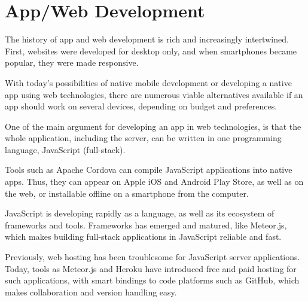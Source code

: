 \section{App/Web Development}

The history of app and web development is rich and increasingly intertwined. First, websites were developed for desktop only, and when smartphones became popular, they were made responsive.

With today's possibilities of native mobile development or developing a native app using web technologies, there are numerous viable alternatives available if an app should work on several devices, depending on budget and preferences.

One of the main argument for developing an app in web technologies, is that the whole application, including the server, can be written in one programming language, JavaScript (full-stack).

Tools such as Apache Cordova can compile JavaScript applications into native apps. Thus, they can appear on Apple iOS and Android Play Store, as well as on the web, or installable offline on a smartphone from the computer.

JavaScript is developing rapidly as a language, as well as its ecosystem of frameworks and tools. Frameworks has emerged and matured, like Meteor.js, which makes building full-stack applications in JavaScript reliable and fast.

Previously, web hosting has been troublesome for JavaScript server applications. Today, tools as Meteor.js and Heroku have introduced free and paid hosting for such applications, with smart bindings to code platforms such as GitHub, which makes collaboration and version handling easy.
